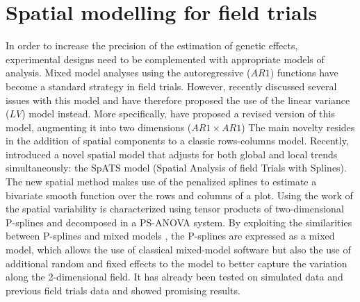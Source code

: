 \section{Spatial modelling for field trials}

In order to increase the precision of the estimation of genetic effects, experimental designs need to be complemented with appropriate models of analysis. Mixed model analyses using the autoregressive ($AR1$) functions   \parencite{cullis_spatial_1991} have become a standard strategy in field trials. 
However, \textcite{piepho_problems_2015} recently discussed several issues with this model and have therefore proposed the use of the linear variance ($LV$) model \parencite{williams_use_1988} instead. More specifically, \textcite{piepho_linear_2010} have proposed a revised version of this model, augmenting it into two dimensions ($AR1 \times AR1$) The main novelty resides in the addition of spatial components to a classic rows-columns model. Recently, 
\textcite{rodriguez-alvarez_correcting_2018} introduced a novel spatial model that adjusts for both global and local trends simultaneously: the SpATS model (Spatial Analysis of field Trials with Splines). The new spatial method makes use of the  penalized splines \parencite{eilers_flexible_1996} to estimate a bivariate smooth function over the rows and columns of a plot. Using the work of \textcite{lee_efficient_2013,lee_hwang_smoothing_2010,lee_p-spline_2011} the spatial variability is characterized using tensor products of two-dimensional P-splines \parencite{dierckx_curve_1995} and decomposed in a PS-ANOVA system. By exploiting the similarities between P-splines and mixed models \parencite{currie_flexible_2002,durban_adjusting_2001, wand_smoothing_2003}, the P-splines are expressed as a mixed model, which allows the use of classical mixed-model software but also the use of additional random and fixed effects to the model to better capture the variation along the 2-dimensional field.
It has already been tested on simulated data \parencite{rodriguez-alvarez_correcting_2018} and previous field trials data \parencite{lado_increased_2013} and showed promising results.\\

